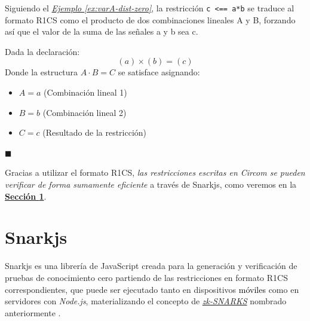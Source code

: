 \documentclass[a4paper,12pt]{report}
\begin{document}
	\vspace{0.3cm}
	
	\noindent Siguiendo el \hyperref[ex:varA-dist-zero]{\textit{Ejemplo \ref{ex:varA-dist-zero}}}, la restricción \texttt{c <== a*b} se traduce al formato R1CS como el producto de dos combinaciones lineales A y B, forzando así que el valor de la suma de las señales a y b sea c.
	
	\begin{mi_ejemplo}[H]
		\caption{Transformación de multiplicación formato R1CS}
		\label{ex:var_zero-to-R1CS}    
		
		Dada la declaración:
		\begin{equation*}
			(a) \times (b) = (c)
		\end{equation*}
		Donde la estructura $A \cdot B = C$ se satisface asignando:
		\begin{itemize}
			\item $A = a$ (Combinación lineal 1)
			\item $B = b$ (Combinación lineal 2)
			\item $C = c$ (Resultado de la restricción)
		\end{itemize}
		
		\hspace*{\fill} $\blacksquare$
	\end{mi_ejemplo}
	
	\vspace{0.3cm}
	
	\noindent Gracias a utilizar el formato R1CS, \textit{las restricciones escritas en Circom se pueden verificar de forma sumamente eficiente} a través de Snarkjs, como veremos en la \hyperref[sec:snarkjs]{\textbf{Sección \ref{sec:snarkjs}}}.
	
	\newpage
	
	\section{Snarkjs}
	\label{sec:snarkjs}
	
	\noindent Snarkjs es una librería de JavaScript creada para la generación y verificación de pruebas de conocimiento cero partiendo de las restricciones en formato R1CS correspondientes, que puede ser ejecutado tanto en dispositivos \textcolor{black}{móviles} como en servidores con \textit{Node.js}, materializando el concepto de \hyperref[def:zk-snarks]{\textit{zk-SNARKS}} nombrado anteriormente \cite{thesis_clara}\cite{circom_articulo_clara}.
	
	\vspace{0.25cm}
	
\end{document}
